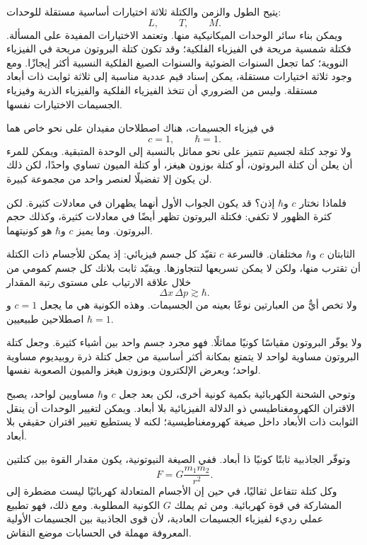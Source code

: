 يتيح الطول والزمن والكتلة ثلاثة اختيارات أساسية مستقلة للوحدات:
\begin{equation}
L,\qquad T,\qquad M.
\end{equation}
ويمكن بناء سائر الوحدات الميكانيكية منها. وتعتمد الاختيارات المفيدة على المسألة. فكتلة شمسية مريحة في الفيزياء الفلكية؛ وقد تكون كتلة البروتون مريحة في الفيزياء النووية؛ كما تجعل السنوات الضوئية والسنوات الصيغ الفلكية النسبية أكثر إيجازًا. ومع وجود ثلاثة اختيارات مستقلة، يمكن إسناد قيم عددية مناسبة إلى ثلاثة ثوابت ذات أبعاد مستقلة. وليس من الضروري أن تتخذ الفيزياء الفلكية والفيزياء الذرية وفيزياء الجسيمات الاختيارات نفسها.

في فيزياء الجسيمات، هناك اصطلاحان مفيدان على نحو خاص هما
\begin{equation}
c=1,
\qquad
\hbar=1.
\end{equation}
ولا توجد كتلة لجسيم تتميز على نحو مماثل بالنسبة إلى الوحدة المتبقية. ويمكن للمرء أن يعلن أن كتلة البروتون، أو كتلة بوزون هيغز، أو كتلة الميون تساوي واحدًا، لكن ذلك لن يكون إلا تفضيلًا لعنصر واحد من مجموعة كبيرة.

فلماذا نختار \(c\) و\(\hbar\) إذن؟ قد يكون الجواب الأول أنهما يظهران في معادلات كثيرة. لكن كثرة الظهور لا تكفي: فكتلة البروتون تظهر أيضًا في معادلات كثيرة، وكذلك حجم البروتون. وما يميز \(c\) و\(\hbar\) هو كونيتهما.

الثابتان \(c\) و\(\hbar\) مختلفان. فالسرعة \(c\) تقيّد كل جسم فيزيائي: إذ يمكن للأجسام ذات الكتلة أن تقترب منها، ولكن لا يمكن تسريعها لتتجاوزها. ويقيّد ثابت بلانك كل جسم كمومي من خلال علاقة الارتياب على مستوى رتبة المقدار
\begin{equation}
\Delta x\,\Delta p\gtrsim\hbar.
\end{equation}
ولا تخص أيٌّ من العبارتين نوعًا بعينه من الجسيمات. وهذه الكونية هي ما يجعل \(c=1\) و\(\hbar=1\) اصطلاحين طبيعيين.

ولا يوفّر البروتون مقياسًا كونيًا مماثلًا. فهو مجرد جسم واحد بين أشياء كثيرة. وجعل كتلة البروتون مساوية لواحد لا يتمتع بمكانة أكثر أساسية من جعل كتلة ذرة روبيديوم مساوية لواحد؛ ويعرض الإلكترون وبوزون هيغز والميون الصعوبة نفسها.

وتوحي الشحنة الكهربائية بكمية كونية أخرى، لكن بعد جعل \(c\) و\(\hbar\) مساويين لواحد، يصبح الاقتران الكهرومغناطيسي ذو الدلالة الفيزيائية بلا أبعاد. ويمكن لتغيير الوحدات أن ينقل الثوابت ذات الأبعاد داخل صيغة كهرومغناطيسية؛ لكنه لا يستطيع تغيير اقتران حقيقي بلا أبعاد.

وتوفّر الجاذبية ثابتًا كونيًا ذا أبعاد. ففي الصيغة النيوتونية، يكون مقدار القوة بين كتلتين
\begin{equation}
F=G\frac{m_1m_2}{r^2}.
\end{equation}
وكل كتلة تتفاعل ثقاليًا، في حين إن الأجسام المتعادلة كهربائيًا ليست مضطرة إلى المشاركة في قوة كهربائية. ومن ثم يملك \(G\) الكونية المطلوبة. ومع ذلك، فهو تطبيع عملي رديء لفيزياء الجسيمات العادية، لأن قوى الجاذبية بين الجسيمات الأولية المعروفة مهملة في الحسابات موضع النقاش.

